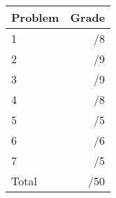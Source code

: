 \documentclass[12pt]{article}
\newcommand{\skipline}{\vspace{12pt}}
\begin{document}
\begin{table}[hbt]
\begin{center}
\begin{tabular}{|l|r|} \hline
Problem&Grade\\
\hline \hline
\cline{1-2} 1 & \enspace\enspace\enspace\enspace\enspace\enspace/8\\
\cline{1-2} 2 & \enspace\enspace\enspace\enspace\enspace\enspace/9\\
\cline{1-2} 3 & \enspace\enspace\enspace\enspace\enspace\enspace/9\\
\cline{1-2} 4 & \enspace\enspace\enspace\enspace\enspace\enspace/8\\
\cline{1-2} 5 & \enspace\enspace\enspace\enspace\enspace\enspace/5\\
\cline{1-2} 6 & \enspace\enspace\enspace\enspace\enspace\enspace/6\\
\cline{1-2} 7 & \enspace\enspace\enspace\enspace\enspace\enspace/5\\
\cline{1-2} Total & \enspace\enspace\enspace\enspace\enspace\enspace/50\\
\hline
\end{tabular}

\skipline

\skipline

\skipline


\end{center}
\end{table}
\newpage
\end{document}
